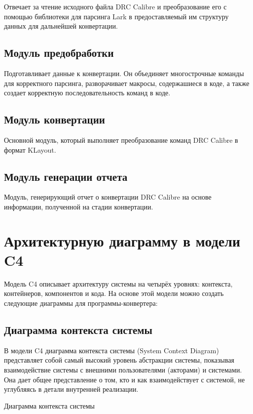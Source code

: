 Отвечает за чтение исходного файла DRC Calibre
и преобразование его с помощью библиотеки для парсинга Lark
в предоставляемый им структуру данных для дальнейшей конвертации.

\subsection{Модуль предобработки}

Подготавливает данные к конвертации.
Он объединяет многострочные команды для корректного парсинга,
разворачивает макросы, содержашиеся в коде, а также
создает корректную последовательность команд в коде.

\subsection{Модуль конвертации}

Основной модуль, который выполняет преобразование команд DRC Calibre
в формат KLayout.

\subsection{Модуль генерации отчета}

Модуль, генерирующий отчет о конвертации DRC Calibre на основе информации,
полученной на стадии конвертации.

\section{Архитектурную диаграмму в модели C4}

Модель C4 описывает архитектуру системы на четырёх уровнях:
контекста, контейнеров, компонентов и кода.
На основе этой модели можно создать следующие диаграммы
для программы-конвертера:

\subsection{Диаграмма контекста системы}

В модели C4 диаграмма контекста системы (System Context Diagram)
представляет собой самый высокий уровень абстракции системы,
показывая взаимодействие системы с внешними пользователями (акторами)
и системами. Она дает общее представление о том,
кто и как взаимодействует с системой,
не углубляясь в детали внутренней реализации.
   
\begin{image}
	\caption{Диаграмма контекста системы}
	\label{fig:c4:system:context}
\end{image}


